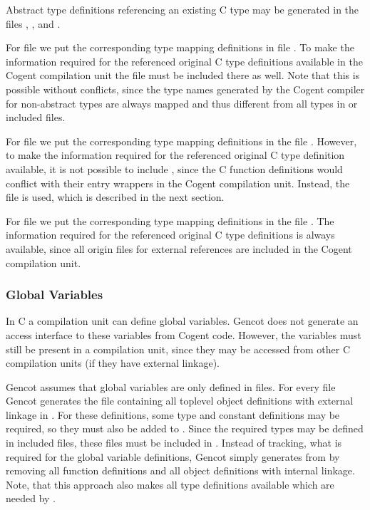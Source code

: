 Abstract type definitions referencing an existing C type may be generated in the files , 
, and . 

For file  we put the corresponding 
type mapping definitions in file . To make the information required for the referenced original 
C type definitions available in the Cogent compilation unit the file  must be 
included there as well. Note that this is 
possible without conflicts, since the type names generated by the Cogent compiler for non-abstract types are always
mapped and thus different from all types in  or included files.

For file  we put the corresponding
type mapping definitions in the file . However, to make the information required for the 
referenced original C type definition
available, it is not possible to include , since the C function definitions would conflict with their
entry wrappers in the Cogent compilation unit. Instead, the file  is used, which is described in the
next section.

For file  we put the corresponding
type mapping definitions in the file . The information required for the referenced original C type
definitions is always available, since all origin files for external references are included in the Cogent compilation unit.

\subsubsection{Global Variables}

In C a compilation unit can define global variables. Gencot does not generate an access interface to these variables
from Cogent code. However, the variables must still be present in a compilation unit, since they may be accessed
from other C compilation units (if they have external linkage). 

Gencot assumes that global variables are only defined in  files. For every file  Gencot generates
the file  containing all toplevel object definitions with external linkage in . For 
these definitions, some type and constant definitions may be required, so they must also be added to .
Since the required types may be defined in included  files, these files must be included in .
Instead of tracking, what is required for the global variable definitions, Gencot simply generates 
from  by removing all function definitions and all object definitions with internal linkage. Note, that
this approach also makes all type definitions available which are needed by .

